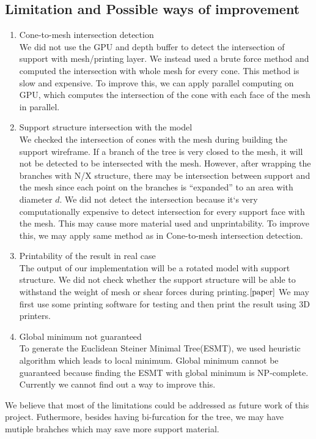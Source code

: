 \documentclass[11pt, a4paper]{article}
\begin{document}
	\subsection{Limitation and Possible ways of improvement}
	\begin{enumerate}
	\item Cone-to-mesh intersection detection
	~\\We did not use the GPU and depth buffer to detect the intersection of support with mesh/printing layer. We instead used a brute force method and computed the intersection with whole mesh for every cone. This method is slow and expensive. To improve this, we can apply parallel computing on GPU, which computes the intersection of the cone with each face of the mesh in parallel.
	\item Support structure intersection with the model
	~\\We checked the intersection of cones with the mesh during building the support wireframe. If a branch of the tree is very closed to the mesh, it will not be detected to be intersected with the mesh. However, after wrapping the branches with N/X structure, there may be intersection between support and the mesh since each point on the branches is “expanded” to an area with diameter $d$. We did not detect the intersection because it`s very computationally expensive to detect intersection for every support face with the mesh. This may cause more material used and unprintability. To improve this, we may apply same method as in Cone-to-mesh intersection detection.
	\item Printability of the result in real case
	~\\The output of our implementation will be a rotated model with support structure. We did not check whether the support structure will be able to withstand the weight of mesh or shear forces during printing.$\cite{paper}$ We may first use some printing software for testing and then print the result using 3D printers.
	\item Global minimum not guaranteed
	~\\To generate the Euclidean Steiner Minimal Tree(ESMT), we used heuristic algorithm which leads to local minimum. Global minimum cannot be guaranteed because finding the ESMT with global minimum is NP-complete. Currently we cannot find out a way to improve this. 
	\end{enumerate} 
	We believe that most of the limitations could be addressed as future work of this project. Futhermore, besides having bi-furcation for the tree, we may have mutiple brahches which may save more support material.
\end{document}
